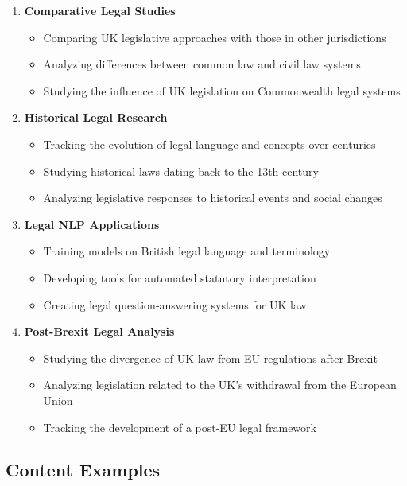 \begin{enumerate}
    \item \textbf{Comparative Legal Studies}
    \begin{itemize}
        \item Comparing UK legislative approaches with those in other jurisdictions
        \item Analyzing differences between common law and civil law systems
        \item Studying the influence of UK legislation on Commonwealth legal systems
    \end{itemize}
    
    \item \textbf{Historical Legal Research}
    \begin{itemize}
        \item Tracking the evolution of legal language and concepts over centuries
        \item Studying historical laws dating back to the 13th century
        \item Analyzing legislative responses to historical events and social changes
    \end{itemize}
    
    \item \textbf{Legal NLP Applications}
    \begin{itemize}
        \item Training models on British legal language and terminology
        \item Developing tools for automated statutory interpretation
        \item Creating legal question-answering systems for UK law
    \end{itemize}
    
    \item \textbf{Post-Brexit Legal Analysis}
    \begin{itemize}
        \item Studying the divergence of UK law from EU regulations after Brexit
        \item Analyzing legislation related to the UK's withdrawal from the European Union
        \item Tracking the development of a post-EU legal framework
    \end{itemize}
\end{enumerate}

\subsection{Content Examples}

